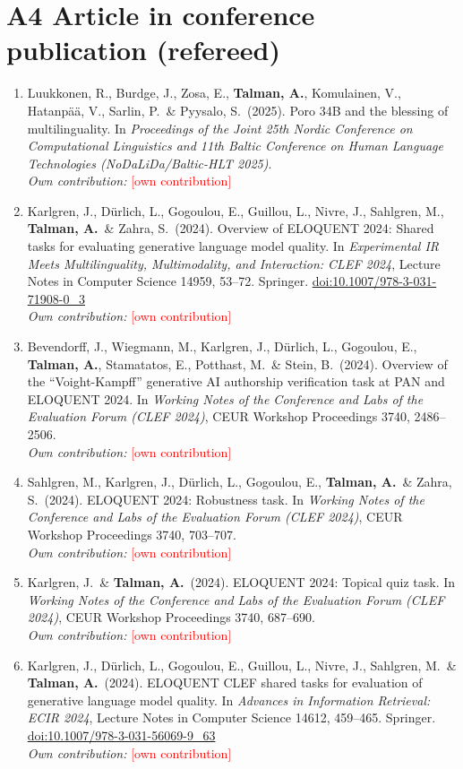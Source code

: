 \documentclass[12pt,a4paper]{article}
\newcommand{\fillin}[1]{\textcolor{red}{[#1]}}
\newcommand{\me}{\textbf{Talman, A.}}
\newcommand{\contrib}[1]{\\\textit{Own contribution:} #1}
\begin{document}
\section{A4 Article in conference publication (refereed)}
\begin{enumerate}[resume*=pubs]
  \item Luukkonen, R., Burdge, J., Zosa, E., \me, Komulainen, V., Hatanpää, V., Sarlin, P.\ \& Pyysalo, S.\ (2025). Poro 34B and the blessing of multilinguality. In \emph{Proceedings of the Joint 25th Nordic Conference on Computational Linguistics and 11th Baltic Conference on Human Language Technologies (NoDaLiDa/Baltic-HLT 2025)}.
  \contrib{\fillin{own contribution}}

  \item Karlgren, J., Dürlich, L., Gogoulou, E., Guillou, L., Nivre, J., Sahlgren, M., \me\ \& Zahra, S.\ (2024). Overview of ELOQUENT 2024: Shared tasks for evaluating generative language model quality. In \emph{Experimental IR Meets Multilinguality, Multimodality, and Interaction: CLEF 2024}, Lecture Notes in Computer Science 14959, 53--72. Springer. \href{https://doi.org/10.1007/978-3-031-71908-0_3}{doi:10.1007/978-3-031-71908-0\_3}
  \contrib{\fillin{own contribution}}

  \item Bevendorff, J., Wiegmann, M., Karlgren, J., Dürlich, L., Gogoulou, E., \me, Stamatatos, E., Potthast, M.\ \& Stein, B.\ (2024). Overview of the ``Voight-Kampff'' generative AI authorship verification task at PAN and ELOQUENT 2024. In \emph{Working Notes of the Conference and Labs of the Evaluation Forum (CLEF 2024)}, CEUR Workshop Proceedings 3740, 2486--2506.
  \contrib{\fillin{own contribution}}

  \item Sahlgren, M., Karlgren, J., Dürlich, L., Gogoulou, E., \me\ \& Zahra, S.\ (2024). ELOQUENT 2024: Robustness task. In \emph{Working Notes of the Conference and Labs of the Evaluation Forum (CLEF 2024)}, CEUR Workshop Proceedings 3740, 703--707.
  \contrib{\fillin{own contribution}}

  \item Karlgren, J.\ \& \me\ (2024). ELOQUENT 2024: Topical quiz task. In \emph{Working Notes of the Conference and Labs of the Evaluation Forum (CLEF 2024)}, CEUR Workshop Proceedings 3740, 687--690.
  \contrib{\fillin{own contribution}}

  \item Karlgren, J., Dürlich, L., Gogoulou, E., Guillou, L., Nivre, J., Sahlgren, M.\ \& \me\ (2024). ELOQUENT CLEF shared tasks for evaluation of generative language model quality. In \emph{Advances in Information Retrieval: ECIR 2024}, Lecture Notes in Computer Science 14612, 459--465. Springer. \href{https://doi.org/10.1007/978-3-031-56069-9_63}{doi:10.1007/978-3-031-56069-9\_63}
  \contrib{\fillin{own contribution}}


\end{enumerate}
\end{document}
